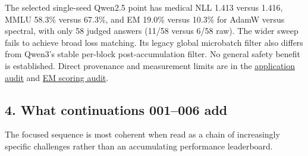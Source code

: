\documentclass[
  british,
  10pt,
  a4paper,
]{article}
\begin{document}
The selected single-\allowbreak{}seed Qwen2.5 point has medical NLL
1.413 versus 1.416, MMLU 58.3\% versus 67.3\%, and EM 19.0\% versus
10.3\% for AdamW versus spectral, with only 58 judged answers (11/58
versus 6/58 raw). The wider sweep fails to achieve broad loss matching.
Its legacy global microbatch filter also differs from Qwen3's stable
per-block post-\allowbreak{}accumulation\allowbreak{} filter. No general
safety benefit is established.\allowbreak{} Direct provenance and
measurement limits are in the
\href{../audit/external-results-audit.md}{application audit} and
\href{../audit/em-results-audit.md}{EM scoring audit}.

\subsection{4. What continuations 001--006
add}\label{synthesis--what-continuations-001006-add}

The focused sequence is most coherent when read as a chain of
increasingly specific challenges rather than an accumulating performance
leaderboard.\allowbreak{}
\end{document}
